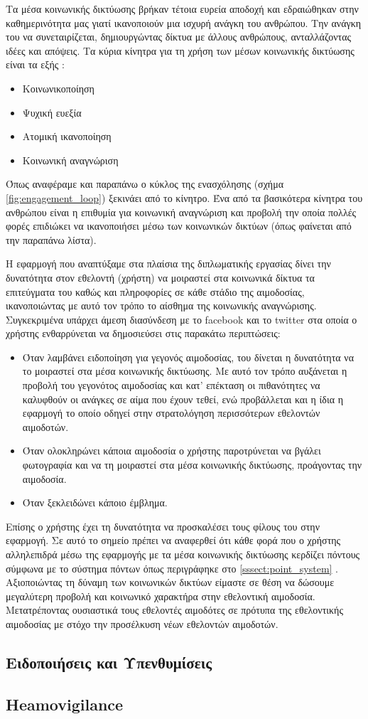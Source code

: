 	Τα μέσα κοινωνικής δικτύωσης βρήκαν τέτοια ευρεία αποδοχή και εδραιώθηκαν στην καθημερινότητα μας γιατί ικανοποιούν μια ισχυρή ανάγκη του ανθρώπου. Την ανάγκη του να συνεταιρίζεται, δημιουργώντας δίκτυα με άλλους ανθρώπους, ανταλλάζοντας ιδέες και απόψεις. Τα κύρια κίνητρα για τη χρήση των μέσων κοινωνικής δικτύωσης είναι τα εξής \cite{Benkler2006}:
	\begin{itemize}
		\item Κοινωνικοποίηση
		\item Ψυχική ευεξία
		\item Ατομική ικανοποίηση
		\item Κοινωνική αναγνώριση
	\end{itemize}		
	
	Όπως αναφέραμε και παραπάνω ο κύκλος της ενασχόλησης (σχήμα \ref{fig:engagement_loop}) ξεκινάει από το κίνητρο. Ένα από τα βασικότερα κίνητρα του ανθρώπου είναι η επιθυμία για κοινωνική αναγνώριση και προβολή \cite{Gamification_on_Participation} την οποία πολλές φορές επιδιώκει να ικανοποιήσει μέσω των κοινωνικών δικτύων (όπως φαίνεται από την παραπάνω λίστα).
	
	Η εφαρμογή που αναπτύξαμε στα πλαίσια της διπλωματικής εργασίας δίνει την δυνατότητα στον εθελοντή (χρήστη) να μοιραστεί στα κοινωνικά δίκτυα τα επιτεύγματα του καθώς και πληροφορίες σε κάθε στάδιο της αιμοδοσίας, ικανοποιώντας με αυτό τον τρόπο το αίσθημα της κοινωνικής αναγνώρισης. Συγκεκριμένα υπάρχει άμεση διασύνδεση με το facebook και το twitter στα οποία ο χρήστης ενθαρρύνεται να δημοσιεύσει στις παρακάτω περιπτώσεις:
	\begin{itemize}
		\item Όταν λαμβάνει ειδοποίηση για γεγονός αιμοδοσίας, του δίνεται η δυνατότητα να το μοιραστεί στα μέσα κοινωνικής δικτύωσης. Με αυτό τον τρόπο αυξάνεται η προβολή του γεγονότος αιμοδοσίας και κατ' επέκταση οι πιθανότητες να καλυφθούν οι ανάγκες σε αίμα που έχουν τεθεί, ενώ προβάλλεται και η ίδια η εφαρμογή το οποίο οδηγεί στην στρατολόγηση περισσότερων εθελοντών αιμοδοτών.
		\item Όταν ολοκληρώνει κάποια αιμοδοσία ο χρήστης παροτρύνεται να βγάλει φωτογραφία και να τη μοιραστεί στα μέσα κοινωνικής δικτύωσης, προάγοντας την αιμοδοσία.
		\item Όταν ξεκλειδώνει κάποιο έμβλημα.
	\end{itemize}
	
	Επίσης ο χρήστης έχει τη δυνατότητα να προσκαλέσει τους φίλους του στην εφαρμογή. Σε αυτό το σημείο πρέπει να αναφερθεί ότι κάθε φορά που ο χρήστης αλληλεπιδρά μέσω της εφαρμογής με τα μέσα κοινωνικής δικτύωσης κερδίζει πόντους σύμφωνα με το σύστημα πόντων όπως περιγράφηκε στο \ref{sssect:point_system} . Αξιοποιώντας τη δύναμη των κοινωνικών δικτύων είμαστε σε θέση να δώσουμε μεγαλύτερη προβολή και κοινωνικό χαρακτήρα στην εθελοντική αιμοδοσία. Μετατρέποντας ουσιαστικά τους εθελοντές αιμοδότες σε πρότυπα της εθελοντικής αιμοδοσίας με στόχο την προσέλκυση νέων εθελοντών αιμοδοτών.
	
	\subsection{Ειδοποιήσεις και Υπενθυμίσεις}
	
	
	\subsection{Heamovigilance}


	
